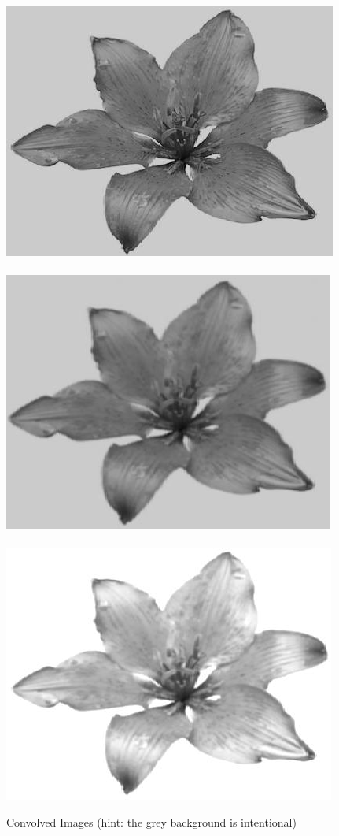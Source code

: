    \begin{figure}[h]
\vspace{-0.2in}
   \centering
			\includegraphics[scale=0.304]{image/darken.png}~~
			\includegraphics[scale=0.3]{image/dark_blur.png}~~
			\includegraphics[scale=0.3]{image/brighten_blur.png}
   \vspace{-0.1in}
         \caption{Convolved Images (hint: the grey background is intentional)}
\label{fig:convolve}
\end{figure}

